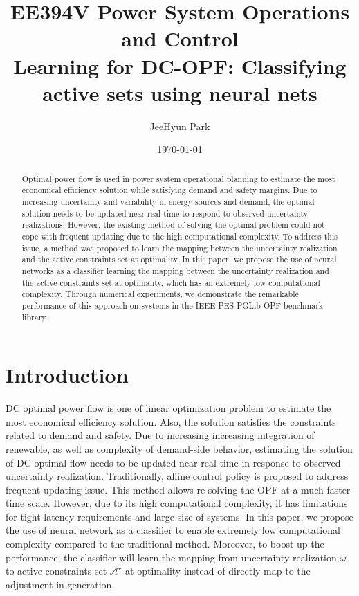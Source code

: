 \documentclass[11pt]{article}
\begin{document}
\title{\bf EE394V Power System Operations and Control\\
Learning for DC-OPF: Classifying active sets using neural nets 
}
\date{\today}
\author{JeeHyun Park}
\maketitle
\begin{abstract}
Optimal power flow is used in power system operational planning to estimate the most economical efficiency solution while satisfying demand and safety margins. Due to increasing uncertainty and variability in energy sources and demand, the optimal solution needs to be updated near real-time to respond to observed uncertainty realizations. However, the existing method of solving the optimal problem could not cope with frequent updating due to the high computational complexity. To address this issue, a method was proposed to learn the mapping between the uncertainty realization and the active constraints set at optimality. In this paper, we propose the use of neural networks as a classifier learning the mapping between the uncertainty realization and the active constraints set at optimality, which has an extremely low computational complexity. Through numerical experiments, we demonstrate the remarkable performance of this approach on systems in the IEEE PES PGLib-OPF benchmark library.
\end{abstract}



\section{Introduction}\label{sec:intro}
DC optimal power flow is one of linear optimization problem to estimate the most economical efficiency solution. Also, the solution satisfies the constraints related to demand and safety. Due to increasing increasing integration of renewable, as well as complexity of demand-side behavior, estimating the solution of DC optimal flow needs to be updated near real-time in response to observed uncertainty realization. Traditionally, affine control policy is proposed to address frequent updating issue. This method allows re-solving the OPF at a much faster time scale. However, due to its high computational complexity, it has limitations for tight latency requirements and large size of systems. In this paper, we propose the use of neural network as a classifier to enable extremely low computational complexity compared to the traditional method. Moreover, to boost up the performance, the classifier will learn the mapping from uncertainty realization $\omega$ to active constraints set $\mathcal{A^{\star}}$ at optimality instead of directly map to the adjustment in generation.
\end{document}
